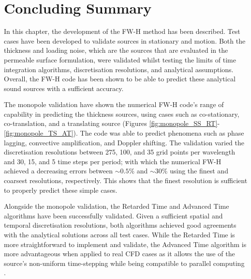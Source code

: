 
\section{Concluding Summary}\label{sec:CS_ch2}

In this chapter, the development of the FW-H method has been described. Test cases have been developed to validate sources in stationary and motion. Both the thickness and loading noise, which are the sources that are evaluated in the permeable surface formulation, were validated whilst testing the limits of time integration algorithms, discretisation resolutions, and analytical assumptions. Overall, the FW-H code has been shown to be able to predict these analytical sound sources with a sufficient accuracy.

The monopole validation have shown the numerical FW-H code's range of capability in predicting the thickness sources, using cases such as co-stationary, co-translation, and a translating source (Figures \ref{fig:monopole_SS_RT}-\ref{fig:monopole_TS_AT}). The code was able to predict phenomena such as phase lagging, convective amplification, and Doppler shifting. The validation varied the discretisation resolutions between 275, 100, and 35 grid points per wavelength and 30, 15, and 5 time steps per period; with which the numerical FW-H achieved a decreasing errors between $\sim0.5\%$ and $\sim30\%$ using the finest and coarsest resolutions, respectively. This shows that the finest resolution is sufficient to properly predict these simple cases.

Alongside the monopole validation, the Retarded Time and Advanced Time algorithms have been successfully validated. Given a sufficient spatial and temporal discretisation resolutions, both algorithms achieved good agreements with the analytical solutions across all test cases. While the Retarded Time is more straightforward to implement and validate, the Advanced Time algorithm is more advantageous when applied to real CFD cases as it allows the use of the source's non-uniform time-stepping while being compatible to parallel computing \cite{Brentner1997, casalino-2001}.


